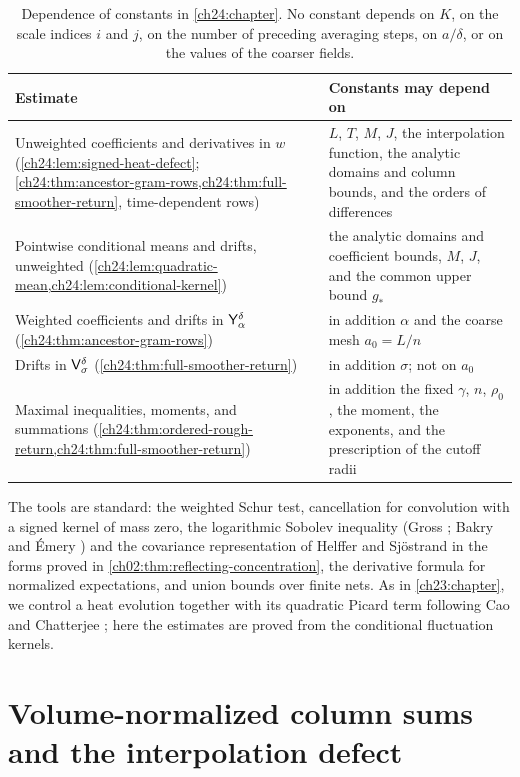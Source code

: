 \begin{table}[ht]
\centering
\small
\begin{tabular}{@{}p{}p{}@{}}
\toprule
Estimate & Constants may depend on\\
\midrule
Unweighted coefficients and derivatives in $w$ (\cref{ch24:lem:signed-heat-defect}; \cref{ch24:thm:ancestor-gram-rows,ch24:thm:full-smoother-return}, time-dependent rows) & $L$, $T$, $M$, $J$, the interpolation function, the analytic domains and column bounds, and the orders of differences\\
Pointwise conditional means and drifts, unweighted (\cref{ch24:lem:quadratic-mean,ch24:lem:conditional-kernel}) & the analytic domains and coefficient bounds, $M$, $J$, and the common upper bound $g_*$\\
Weighted coefficients and drifts in $\mathsf Y_{\alpha}^{\delta}$ (\cref{ch24:thm:ancestor-gram-rows}) & in addition $\alpha$ and the coarse mesh $a_0=L/n$\\
Drifts in $\mathsf V_{\sigma}^{\delta}$ (\cref{ch24:thm:full-smoother-return}) & in addition $\sigma$; not on $a_0$\\
Maximal inequalities, moments, and summations (\cref{ch24:thm:ordered-rough-return,ch24:thm:full-smoother-return}) & in addition the fixed $\gamma$, $n$, $\rho_0$, the moment, the exponents, and the prescription of the cutoff radii\\
\bottomrule
\end{tabular}
\caption{Dependence of constants in \cref{ch24:chapter}. No constant depends on $K$, on the scale indices $i$ and $j$, on the number of preceding averaging steps, on $a/\delta$, or on the values of the coarser fields.}
\label{ch24:tab:constants}
\end{table}

The tools are standard: the weighted Schur test, cancellation for convolution with a signed kernel of mass zero, the logarithmic Sobolev inequality (Gross \cite{Gross1975}; Bakry and \'Emery \cite{BakryEmery1985}) and the covariance representation of Helffer and Sj\"ostrand \cite{HelfferSjostrand1994} in the forms proved in \cref{ch02:thm:reflecting-concentration}, the derivative formula for normalized expectations, and union bounds over finite nets. As in \cref{ch23:chapter}, we control a heat evolution together with its quadratic Picard term following Cao and Chatterjee \cite[Section~2.1]{CCHeat2022v4}; here the estimates are proved from the conditional fluctuation kernels.

\section{Volume-normalized column sums and the interpolation defect}\label{ch24:sec:defect}

